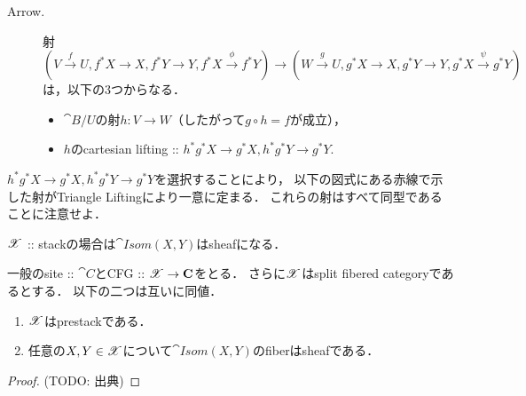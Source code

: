 \documentclass[a4paper, dvipdfmx]{jsarticle}
\newcommand{\Isom}{\cat{Isom}}
\begin{document}
\begin{Def}[$\Isom(X, Y)$]
\begin{description}
        \item[Arrow.]
            射
            \[
                (V \xrightarrow{f} U, f^*X \to X, f^*Y \to Y, f^*X \xrightarrow{\phi} f^*Y)
                \to
                (W \xrightarrow{g} U, g^*X \to X, g^*Y \to Y, g^*X \xrightarrow{\psi} g^*Y)
            \]
            は，以下の$3$つからなる．
            \begin{itemize}
                \item $\cat{B}/U$の射$h \colon V \to W$（したがって$g \circ h=f$が成立），
                \item $h$のcartesian lifting :: $h^*g^*X \to g^*X, h^*g^*Y \to g^*Y$.
            \end{itemize}
    \end{description}
    $h^*g^*X \to g^*X, h^*g^*Y \to g^*Y$を選択することにより，
    以下の図式にある赤線で示した射がTriangle Liftingにより一意に定まる．
    これらの射はすべて同型であることに注意せよ．
    \begin{center}
    \end{center}
\end{Def}

$\mathscr{X}$ :: stackの場合は$\Isom(X, Y)$はsheafになる．
\begin{Lemma}
    一般のsite :: $\cat{C}$とCFG :: $\mathscr{X} \to \mathbf{C}$をとる．
    さらに$\mathscr{X}$はsplit fibered categoryであるとする．
    以下の二つは互いに同値．
    \begin{enumerate}
        \item $\mathscr{X}$はprestackである．
        \item 任意の$X, Y \in \mathscr{X}$について$\Isom(X, Y)$のfiberはsheafである．
    \end{enumerate}
\end{Lemma}
\begin{proof}
    (TODO: 出典)
\end{proof}
\end{document}
